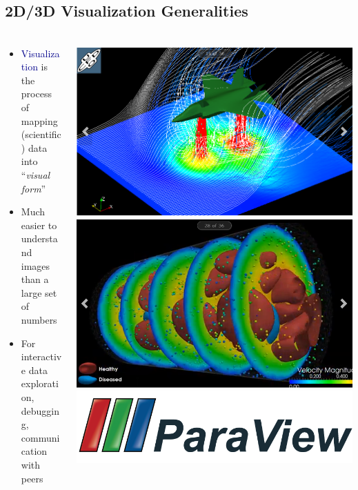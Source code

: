 \subsection{2D/3D Visualization Generalities}
\begin{frame}
    \frametitle{}
    \framesubtitle{}

    \begin{columns} %
    \begin{column}{5.25cm}
        \begin{itemize}
                \item \textcolor{DarkBlue}{Visualization} is the process of mapping (scientific) data into ``{\it visual form}''
                \item Much easier to understand images than a large set of numbers
                \item For interactive data exploration, debugging, communication with peers
        \end{itemize}
    \end{column}
    \begin{column}{7cm}
        \href{http://www.paraview.org/gallery/}{\includegraphics[width=.475\columnwidth]{figs/paraview/ParaView-gallery01}}
        \href{http://www.paraview.org/gallery/}{\includegraphics[width=.475\columnwidth]{figs/paraview/ParaView-gallery03}}
        \centering
        \href{http://www.paraview.org}{\includegraphics[width=.45\columnwidth]{./figs/visit-logos/ParaViewLogo}}



\end{column}
\end{columns}
\end{frame}
